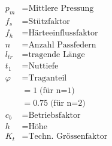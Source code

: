    \begin{scriptsize}
    \begin{minipage}{0.5\linewidth}
        \begin{center}
           \begin{align*}
               p_m &= \text{Mittlere Pressung}
               \\f_s &= \text{Stützfaktor}
               \\f_h &= \text{Härteeinflussfaktor}
               \\n &= \text{Anzahl Passfedern}
               \\l_{tr}&= \text{tragende Länge}
               \\t_1 &= \text{Nuttiefe}
               \\\varphi &= \text{Traganteil} 
               \\ &= 1 \; \text{(für n=1)}
               \\ &= 0.75 \; \text{(für n=2)}
               \\c_b &= \text{Betriebsfaktor}
               \\h &= \text{Höhe}
               \\K_t &= \text{Techn. Grössenfaktor}
            \end{align*}
        \end{center}
   \end{minipage}
   \end{scriptsize}
   \begin{footnotesize}
   \end{footnotesize}
